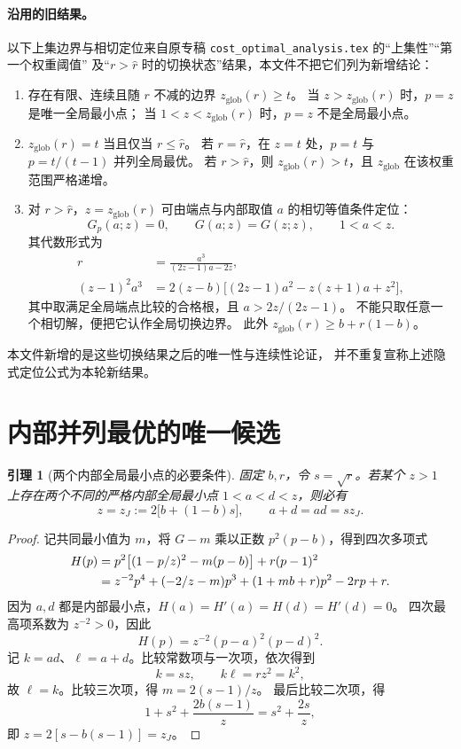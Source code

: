 \documentclass[UTF8,zihao=-4]{ctexart}
\newtheorem{lemma}[theorem]{引理}
\theoremstyle{definition}
\newcommand{\rhat}{\hat r}
\newcommand{\zglob}{z_{\mathrm{glob}}}
\begin{document}
\paragraph{沿用的旧结果。}
以下上集边界与相切定位来自原专稿
\texttt{cost\_optimal\_analysis.tex} 的“上集性”“第一个权重阈值”
及“$r>\hat r$ 时的切换状态”结果，本文件不把它们列为新增结论：
\begin{enumerate}
\item 存在有限、连续且随 $r$ 不减的边界 $\zglob(r)\ge t$。
当 $z>\zglob(r)$ 时，$p=z$ 是唯一全局最小点；
当 $1<z<\zglob(r)$ 时，$p=z$ 不是全局最小点。
\item $\zglob(r)=t$ 当且仅当 $r\le\rhat$。
若 $r=\rhat$，在 $z=t$ 处，$p=t$ 与 $p=t/(t-1)$ 并列全局最优。
若 $r>\rhat$，则 $\zglob(r)>t$，且 $\zglob$ 在该权重范围严格递增。
\item 对 $r>\rhat$，$z=\zglob(r)$ 可由端点与内部取值 $a$ 的相切等值条件定位：
\begin{equation}\label{eq:tangent-abstract}
 G_p(a;z)=0,\qquad G(a;z)=G(z;z),\qquad 1<a<z.
\end{equation}
其代数形式为
\begin{align}
 r&=\frac{a^3}{(2z-1)a-2z},\label{eq:tangent-r}\\
 (z-1)^2a^3
 &=2(z-b)\bigl[(2z-1)a^2-z(z+1)a+z^2\bigr],\label{eq:tangent-cubic}
 \end{align}
其中取满足全局端点比较的合格根，且 $a>2z/(2z-1)$。
不能只取任意一个相切解，便把它认作全局切换边界。
此外 $\zglob(r)\ge b+r(1-b)$。
\end{enumerate}
本文件新增的是这些切换结果之后的唯一性与连续性论证，
并不重复宣称上述隐式定位公式为本轮新结果。

\section{内部并列最优的唯一候选}

\begin{lemma}[两个内部全局最小点的必要条件]\label{lem:double}
固定 $b,r$，令 $s=\sqrt r$。若某个 $z>1$ 上存在两个不同的严格内部全局最小点
$1<a<d<z$，则必有
\begin{equation}\label{eq:zJ}
 z=z_J:=2\bigl[b+(1-b)s\bigr],
 \qquad a+d=ad=sz_J.
\end{equation}
\end{lemma}
\begin{proof}
记共同最小值为 $m$，将 $G-m$ 乘以正数 $p^2(p-b)$，得到四次多项式
\begin{align}\label{eq:H}
 H(p)&=p^2\bigl[(1-p/z)^2-m(p-b)\bigr]+r(p-1)^2\\
 &=z^{-2}p^4+(-2/z-m)p^3+(1+mb+r)p^2-2rp+r.\notag
\end{align}
因为 $a,d$ 都是内部最小点，$H(a)=H'(a)=H(d)=H'(d)=0$。
四次最高项系数为 $z^{-2}>0$，因此
\[
 H(p)=z^{-2}(p-a)^2(p-d)^2.
\]
记 $k=ad$、$\ell=a+d$。比较常数项与一次项，依次得到
\[
 k=sz,\qquad k\ell=rz^2=k^2,
\]
故 $\ell=k$。比较三次项，得 $m=2(s-1)/z$。
最后比较二次项，得
\[
 1+s^2+\frac{2b(s-1)}z=s^2+\frac{2s}z,
\]
即 $z=2[s-b(s-1)]=z_J$。
\end{proof}
\end{document}
